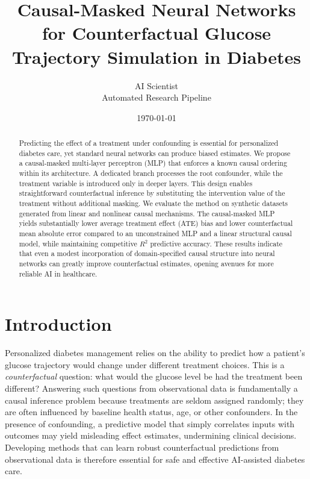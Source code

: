 \documentclass[11pt,a4paper]{article}
\begin{document}
\title{Causal-Masked Neural Networks for Counterfactual Glucose Trajectory Simulation in Diabetes}
\author{AI Scientist \\ Automated Research Pipeline}
\date{\today}
\maketitle

\begin{abstract}
Predicting the effect of a treatment under confounding is essential for personalized diabetes care, yet standard neural networks can produce biased estimates. We propose a causal‑masked multi‑layer perceptron (MLP) that enforces a known causal ordering within its architecture. A dedicated branch processes the root confounder, while the treatment variable is introduced only in deeper layers. This design enables straightforward counterfactual inference by substituting the intervention value of the treatment without additional masking. We evaluate the method on synthetic datasets generated from linear and nonlinear causal mechanisms. The causal‑masked MLP yields substantially lower average treatment effect (ATE) bias and lower counterfactual mean absolute error compared to an unconstrained MLP and a linear structural causal model, while maintaining competitive $R^2$ predictive accuracy. These results indicate that even a modest incorporation of domain‑specified causal structure into neural networks can greatly improve counterfactual estimates, opening avenues for more reliable AI in healthcare.
\end{abstract}

\section{Introduction}
\label{sec:intro}
Personalized diabetes management relies on the ability to predict how a patient's glucose trajectory would change under different treatment choices. This is a \emph{counterfactual} question: what would the glucose level be had the treatment been different? Answering such questions from observational data is fundamentally a causal inference problem because treatments are seldom assigned randomly; they are often influenced by baseline health status, age, or other confounders. In the presence of confounding, a predictive model that simply correlates inputs with outcomes may yield misleading effect estimates, undermining clinical decisions. Developing methods that can learn robust counterfactual predictions from observational data is therefore essential for safe and effective AI-assisted diabetes care.
\end{document}
